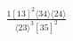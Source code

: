 \documentclass[varwidth, border=5pt]{standalone}
\begin{document}
\begin{my}
$\begin{gathered}
\scriptscriptstyle\frac{1[13]^2⟨34⟩⟨24⟩}{⟨23⟩^3[35]^2}
\end{gathered}$
\end{my}
\end{document}
